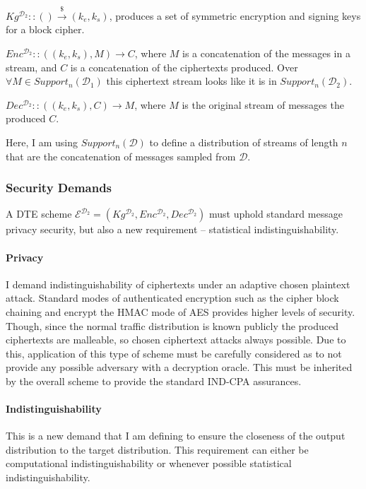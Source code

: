 \documentclass[ %
                    author={Samuel Russell},
                supervisor={Prof. Bogdan Warinschi},
                    degree={MEng},
                     title={Innocuous Ciphertexts},
                  subtitle={The DE-CENSOR Scheme},
                      type={Research},
                      year={2018} ]{dissertation}
\begin{document}
$Kg^{\mathcal{D}_2} :: () \xrightarrow{\$} (k_e,k_s)$, produces a set of symmetric encryption and signing keys for a block cipher.

$Enc^{\mathcal{D}_2} :: ((k_e,k_s), M) \rightarrow C$, where $M$ is a concatenation of the messages in a stream, and $C$ is a concatenation of the ciphertexts produced. Over $\forall M \in Support_n(\mathcal{D}_1)$ this ciphertext stream looks like it is in  $Support_n(\mathcal{D}_2)$.

$Dec^{\mathcal{D}_2} :: ((k_e,k_s), C) \rightarrow M$, where $M$ is the original stream of messages the produced $C$.

Here, I am using $Support_n(\mathcal{D})$ to define a distribution of streams of length $n$ that are the concatenation of messages sampled from $\mathcal{D}$.

\subsubsection{Security Demands}

A DTE scheme $\mathcal{E}^{\mathcal{D}_2} = (Kg^{\mathcal{D}_2}, Enc^{\mathcal{D}_2}, Dec^{\mathcal{D}_2})$ must uphold standard message privacy security, but also a new requirement -- statistical indistinguishability.

\paragraph{Privacy}

I demand indistinguishability of ciphertexts under an adaptive chosen plaintext attack. Standard modes of authenticated encryption such as the cipher block chaining and encrypt the HMAC mode of AES provides higher levels of security.
Though, since the normal traffic distribution is known publicly the produced ciphertexts are malleable, so chosen ciphertext attacks always possible.
Due to this, application of this type of scheme must be carefully considered as to not provide any possible adversary with a decryption oracle.
This must be inherited by the overall scheme to provide the standard IND-CPA assurances.

\paragraph{Indistinguishability}

This is a new demand that I am defining to ensure the closeness of the output distribution to the target distribution.
This requirement can either be computational indistinguishability or whenever possible statistical indistinguishability.
\end{document}
